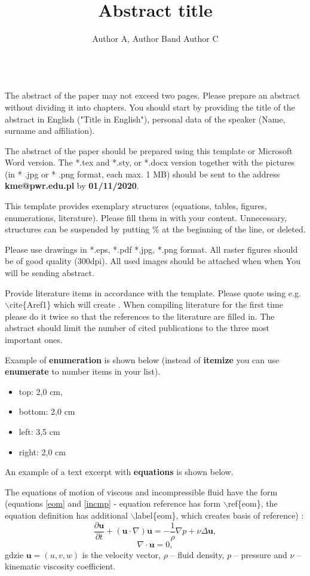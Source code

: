 \documentclass[english, a4paper]{article}
\title{Abstract title}
\author{
Author A\affmark[1], Author B\affmark[1] and Author C\affmark[2]\\
\affaddr{\affmark[1] Affiliation of authors A and B}\\
\affaddr{\affmark[2] Affiliation of author C}
}
\begin{document}
\maketitle

The abstract of the paper may not exceed two pages. Please prepare an abstract without dividing it into chapters. You should start by providing the title of the abstract in English ("Title in English"), personal data of the speaker (Name, surname and affiliation).

The abstract of the paper should be prepared using this template or Microsoft Word version. The *.tex and *.sty, or *.docx version together with the pictures (in * .jpg or * .png format, each max. 1 MB) should be sent to the address \textbf{kme@pwr.edu.pl} by \textbf{ 01/11/2020}.

This template provides exemplary structures (equations, tables, figures, enumerations, literature). Please fill them in with your content. Unnecessary, structures can be suspended by putting \% at the beginning of the line, or deleted.

Please use drawings in *.eps, *.pdf *.jpg, *.png format. All raster figures should be of good quality (300dpi). All used images should be attached when when You will be sending abstract.

Provide literature items in accordance with the template. Please quote using e.g. $\backslash$cite\{Aref1\} which will create \cite{Aref1}. When compiling literature for the first time please do it twice so that the references to the literature are filled in. The abstract should limit the number of cited publications to the three most important ones.

Example of \textbf{enumeration} is shown below (instead of \textbf{itemize} you can use \textbf{enumerate} to number items in your list).

\begin{itemize}
\item top: 2,0 cm,
\item bottom: 2,0 cm
\item left:  3,5 cm
\item right: 2,0 cm
\end{itemize}

An example of a text excerpt with \textbf{equations} is shown below.

The equations of motion of viscous and incompressible fluid have the form (equations \ref{eom} and \ref{incmp} - equation reference has form  $\backslash$ref\{eom\}, the equation definition has additional $\backslash$label\{eom\}, which creates basis of reference) \cite{Kochin, Aref1}:
\begin{equation}\label{eom}
\frac{\partial{\mathbf{u}}}{\partial t}+(\mathbf{u} \cdot \nabla)\mathbf{u}=-\frac{1}{\rho}\nabla p+\nu \Delta \mathbf{u},
\end{equation}
\begin{equation}\label{incmp}
\nabla \cdot \mathbf{u}=0,
\end{equation}
gdzie $\mathbf{u}=(u,v,w)$ is the velocity vector, $\rho$ -- fluid density, $p$ -- pressure  and $\nu$ --  kinematic viscosity coefficient.
\end{document}
